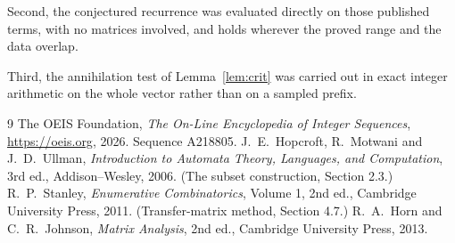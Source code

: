 \documentclass[11pt,a4paper]{article}
\theoremstyle{plain}
\theoremstyle{definition}
\begin{document}
Second, the conjectured recurrence was evaluated directly on those published terms, with no
matrices involved, and holds wherever the proved range and the data overlap.

Third, the annihilation test of Lemma~\ref{lem:crit} was carried out in exact integer
arithmetic on the whole vector rather than on a sampled prefix.

\begin{thebibliography}{9}
 The OEIS Foundation, \emph{The On-Line Encyclopedia of Integer
Sequences}, \url{https://oeis.org}, 2026. Sequence A218805.
 J.~E.~Hopcroft, R.~Motwani and J.~D.~Ullman, \emph{Introduction to Automata
Theory, Languages, and Computation}, 3rd ed., Addison--Wesley, 2006. (The subset
construction, Section 2.3.)
 R.~P.~Stanley, \emph{Enumerative Combinatorics}, Volume 1, 2nd ed.,
Cambridge University Press, 2011. (Transfer-matrix method, Section 4.7.)
 R.~A.~Horn and C.~R.~Johnson, \emph{Matrix Analysis}, 2nd ed., Cambridge
University Press, 2013.
\end{thebibliography}
\end{document}

